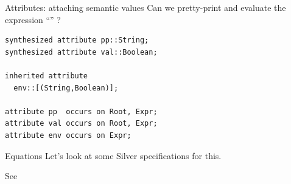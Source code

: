 \documentclass[11pt,aspectratio=169]{beamer}
\newcommand{\ys}{1.3}
\newcommand{\enve}[2]{\draw[blue] ($(#1-0.4,\ys*#2-0.35)$) circle(0.15);}
\newcommand{\envd}[2]{\filldraw[blue] ($(#1-0.4,\ys*#2-0.35)$) circle(0.05);}
\newcommand{\envc}[2]{\filldraw[blue] ($(#1-0.4,\ys*#2-0.35)$) circle(0.15);}
\newcommand{\ppe}[2]{\draw[dgreen] ($(#1+0.4,\ys*#2-0.35)$) circle(0.15);}
\newcommand{\ppd}[2]{\filldraw[dgreen] ($(#1+0.4,\ys*#2-0.35)$) circle(0.05);}
\newcommand{\ppc}[2]{\filldraw[dgreen] ($(#1+0.4,\ys*#2-0.35)$) circle(0.15);}
\newcommand{\vale}[2]{\draw[red] ($(#1+0.8,\ys*#2-0.35)$) circle(0.15);}
\newcommand{\vald}[2]{\filldraw[red] ($(#1+0.8,\ys*#2-0.35)$) circle(0.05);}
\newcommand{\valc}[2]{\filldraw[red] ($(#1+0.8,\ys*#2-0.35)$) circle(0.15);}
\newcommand{\erre}[2]{\draw[orange] ($(#1+1.2,\ys*#2-0.35)$) circle(0.15);}
\newcommand{\rtn}[3]{
\draw ($(#1,#2*\ys)$) node{#3};
\ppe{#1}{#2}
\vale{#1}{#2}

\draw[gray] ($(#1+0.65,\ys*#2+0.25)$) --
            ($(#1-0.3,\ys*#2+0.25)$) arc (90:270:4.5mm);

\draw[gray] ($(#1+0.65,\ys*#2+0.25)$) arc (90:-90:4.5mm) -- 
            ($(#1-0.3,\ys*#2-0.65)$) ;
}
\newcommand{\tn}[3]{
\rtn{#1}{#2}{#3}
\enve{#1}{#2}
}
\newcommand{\tnstr}[3]{
\draw ($(#1,#2*\ys)$) node{#3};
\draw[gray] ($(#1+0.25,\ys*#2+0.25)$) --
            ($(#1-0.2,\ys*#2+0.25)$) arc (90:270:2.5mm);

\draw[gray] ($(#1+0.25,\ys*#2+0.25)$) arc (90:-90:2.5mm) -- 
            ($(#1-0.2,\ys*#2-0.25)$) ;

}
\newcommand{\tedge}[4]{
\draw[gray] ($(#1+\xsh,\ys*#2-0.65)$) -- ($(#3+\xsh,\ys*#4+0.25)$);
}
\newcommand{\ppeval}{
\pause
\ppd{4}{4} %
\pause
\ppd{4}{3} %

\pause
\ppd{4}{2} %
\pause
\ppc{4}{2} %
\pause
\ppd{6.5}{2}  %

\pause
\ppd{5.25}{1} %
\pause
\ppc{5.25}{1} %
\pause
\ppd{7.75}{1} %
\pause
\ppc{7.75}{1} %

\pause
\ppc{6.5}{2}  %

\pause
\ppc{4}{3} %

\pause
\ppc{4}{4} %
}
\newcommand{\valeval}{
\pause\vald{4}{4} %
\pause\vald{4}{3} %

\pause\vald{6.5}{2}  %
\pause\vald{5.25}{1} %
\pause\valc{5.25}{1} %

\pause\vald{7.75}{1} %

\pause\envd{7.75}{1} %

\pause\envd{6.5}{2}  %

\pause
\draw ($(5.5,\ys*-0.5)$) node {\small\texttt{body.env = addEnv(name, dval.val, e.env);}};

\pause\vald{4}{2} %
\pause\valc{4}{2} %

\pause\envd{4}{3} %
\pause\envc{4}{3} %

\pause\envc{6.5}{2}  %

\pause
\draw[white] ($(5.5,\ys*-0.5)$) node {\small\texttt{body.env = addEnv(name, dval.val, e.env);}};

\pause\envc{7.75}{1} %

\pause\valc{7.75}{1} %
\pause\valc{6.5}{2}  %

\pause\valc{4}{3} %

\pause\valc{4}{4} %
}
\newcommand{\xsh}{0.15}
\begin{document}
\begin{frame}[t,fragile]{Attributes: attaching semantic values}
Can we pretty-print and evaluate the expression
``'' ?

\bigskip

\begin{minipage}[t]{2.9in}
\vspace{0pt}
\end{minipage}
\begin{minipage}[t]{2.1in}
\vspace{0pt}
\small
\begin{verbatim}
synthesized attribute pp::String;
synthesized attribute val::Boolean;

inherited attribute 
  env::[(String,Boolean)];

attribute pp  occurs on Root, Expr;
attribute val occurs on Root, Expr;
attribute env occurs on Expr;
\end{verbatim}
\end{minipage}

\end{frame}

\begin{frame}{Equations}
Let's look at some Silver specifications for this.

\bigskip
See 
\end{frame}
\end{document}
